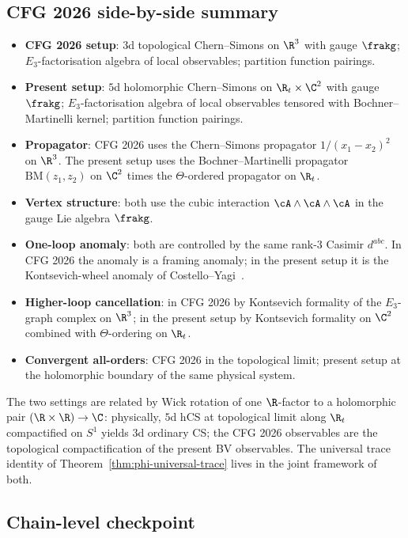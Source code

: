 \subsection*{CFG 2026 side-by-side summary}

\begin{itemize}
\item \textbf{CFG 2026 setup}: $3$d topological Chern--Simons on $\R^3$
with gauge $\frakg$; $E_3$-factorisation algebra of local observables;
partition function pairings.
\item \textbf{Present setup}: $5$d holomorphic Chern--Simons on
$\R_t\times\C^2$ with gauge $\frakg$; $E_3$-factorisation algebra of
local observables tensored with Bochner--Martinelli kernel; partition
function pairings.
\item \textbf{Propagator}: CFG 2026 uses the Chern--Simons propagator
$1/(x_1 - x_2)^2$ on $\R^3$. The present setup uses the
Bochner--Martinelli propagator $\mathrm{BM}(z_1, z_2)$ on $\C^2$
times the $\Theta$-ordered propagator on $\R_t$.
\item \textbf{Vertex structure}: both use the cubic interaction
$\cA \wedge \cA \wedge \cA$ in the gauge Lie algebra $\frakg$.
\item \textbf{One-loop anomaly}: both are controlled by the same
rank-$3$ Casimir $d^{abc}$. In CFG 2026 the anomaly is a framing
anomaly; in the present setup it is the Kontsevich-wheel anomaly
of Costello--Yagi~\cite{CostelloYagi2018}.
\item \textbf{Higher-loop cancellation}: in CFG 2026 by Kontsevich
formality of the $E_3$-graph complex on $\R^3$; in the present setup
by Kontsevich formality on $\C^2$ combined with $\Theta$-ordering on
$\R_t$.
\item \textbf{Convergent all-orders}: CFG 2026 in the topological limit;
present setup at the holomorphic boundary of the same physical system.
\end{itemize}

The two settings are related by Wick rotation of one $\R$-factor to a
holomorphic pair $(\R \times \R)\to\C$: physically, $5$d hCS at
topological limit along $\R_t$ compactified on $S^1$ yields $3$d
ordinary CS; the CFG 2026 observables are the topological
compactification of the present BV observables. The universal trace
identity of Theorem~\ref{thm:phi-universal-trace} lives in the joint
framework of both.

\subsection*{Chain-level checkpoint}

